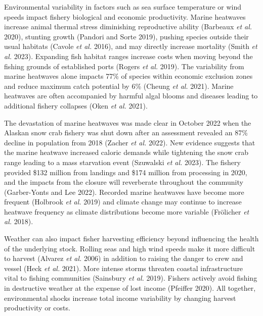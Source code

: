 \documentclass[
  letterpaper,
  DIV=11,
  numbers=noendperiod]{scrartcl}
\theoremstyle{plain}
\theoremstyle{plain}
\theoremstyle{remark}
\begin{document}
Environmental variability in factors such as sea surface temperature or
wind speeds impact fishery biological and economic productivity. Marine
heatwaves increase animal thermal stress diminishing reproductive
ability (Barbeaux \emph{et al.} 2020), stunting growth (Pandori and
Sorte 2019), pushing species outside their usual habitats (Cavole
\emph{et al.} 2016), and may directly increase mortality (Smith \emph{et
al.} 2023). Expanding fish habitat ranges increase costs when moving
beyond the fishing grounds of established ports (Rogers \emph{et al.}
2019). The variability from marine heatwaves alone impacts 77\% of
species within economic exclusion zones and reduce maximum catch
potential by 6\% (Cheung \emph{et al.} 2021). Marine heatwaves are often
accompanied by harmful algal blooms and diseases leading to additional
fishery collapses (Oken \emph{et al.} 2021).

The devastation of marine heatwaves was made clear in October 2022 when
the Alaskan snow crab fishery was shut down after an assessment revealed
an 87\% decline in population from 2018 (Zacher \emph{et al.} 2022). New
evidence suggests that the marine heatwave increased caloric demands
while tightening the snow crab range leading to a mass starvation event
(Szuwalski \emph{et al.} 2023). The fishery provided \$132 million from
landings and \$174 million from processing in 2020, and the impacts from
the closure will reverberate throughout the community (Garber-Yonts and
Lee 2022). Recorded marine heatwaves have become more frequent (Holbrook
\emph{et al.} 2019) and climate change may continue to increase heatwave
frequency as climate distributions become more variable (Frölicher
\emph{et al.} 2018).

Weather can also impact fisher harvesting efficiency beyond influencing
the health of the underlying stock. Rolling seas and high wind speeds
make it more difficult to harvest (Alvarez \emph{et al.} 2006) in
addition to raising the danger to crew and vessel (Heck \emph{et al.}
2021). More intense storms threaten coastal infrastructure vital to
fishing communities (Sainsbury \emph{et al.} 2019). Fishers actively
avoid fishing in destructive weather at the expense of lost income
(Pfeiffer 2020). All together, environmental shocks increase total
income variability by changing harvest productivity or costs.
\end{document}
